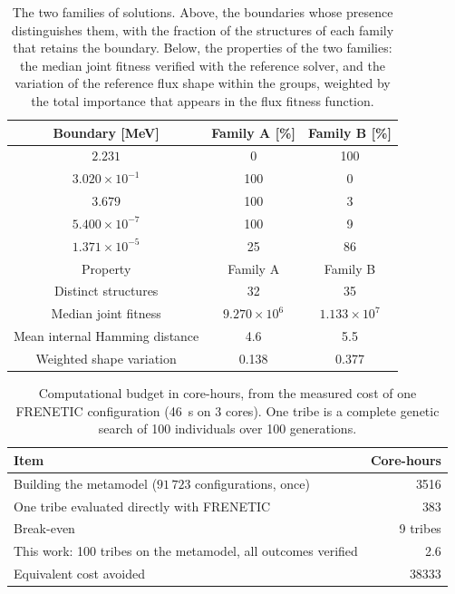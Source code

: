 \begin{table}[htbp]
\centering
\caption{The two families of solutions. Above, the boundaries whose presence
distinguishes them, with the fraction of the structures of each family that
retains the boundary. Below, the properties of the two families: the median
joint fitness verified with the reference solver, and the variation of the
reference flux shape within the groups, weighted by the total importance that
appears in the flux fitness function.}
\label{tab:families}
\begin{tabular}{|c|c|c|}
\hline
Boundary [MeV] & Family A [\%] & Family B [\%] \\ \hline
    $2.231$ & 0 & 100 \\
    $3.020\times10^{-1}$ & 100 & 0 \\
    $3.679$ & 100 & 3 \\
    $5.400\times10^{-7}$ & 100 & 9 \\
    $1.371\times10^{-5}$ & 25 & 86 \\
\hline
    Property & Family A & Family B \\ \hline
    Distinct structures & 32 & 35 \\
    Median joint fitness & $9.270\times10^{6}$ & $1.133\times10^{7}$ \\
    Mean internal Hamming distance & 4.6 & 5.5 \\
    Weighted shape variation & 0.138 & 0.377 \\ \hline
\end{tabular}
\end{table}

\begin{table}[htbp]
\centering
\caption{Computational budget in core-hours, from the measured cost of one
FRENETIC configuration (46~s on 3 cores). One tribe is a complete genetic
search of 100 individuals over 100 generations.}
\label{tab:cost}
\begin{tabular}{|l|r|}
\hline
Item & Core-hours \\ \hline
Building the metamodel ($91\,723$ configurations, once) & 3516 \\
One tribe evaluated directly with FRENETIC & 383 \\
Break-even & 9 tribes \\ \hline
This work: 100 tribes on the metamodel, all outcomes verified & 2.6 \\
Equivalent cost avoided & 38333 \\ \hline
\end{tabular}
\end{table}

